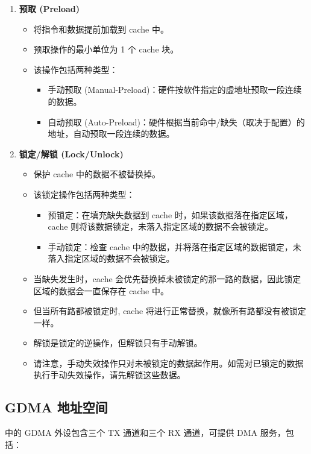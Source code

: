 \documentclass[main\_\_CN.tex]{subfiles}
\begin{document}
\begin{enumerate}
\item \textbf{预取 (Preload)}
\begin{itemize}
    \item 将指令和数据提前加载到 cache 中。
    \item 预取操作的最小单位为 1 个 cache 块。
    \item 该操作包括两种类型：
    \begin{itemize}
    \item 手动预取 (Manual-Preload)：硬件按软件指定的虚地址预取一段连续的数据。
    \item 自动预取 (Auto-Preload)：硬件根据当前命中/缺失（取决于配置）的地址，自动预取一段连续的数据。
    \end{itemize}
\end{itemize}

\item \textbf{锁定/解锁 (Lock/Unlock)}
\begin{itemize}
    \item 保护 cache 中的数据不被替换掉。
    \item 该锁定操作包括两种类型：
    \begin{itemize}
    \item 预锁定：在填充缺失数据到 cache 时，如果该数据落在指定区域，cache 则将该数据锁定，未落入指定区域的数据不会被锁定。
    \item 手动锁定：检查 cache 中的数据，并将落在指定区域的数据锁定，未落入指定区域的数据不会被锁定。
    \end{itemize}
    \item 当缺失发生时，cache 会优先替换掉未被锁定的那一路的数据，因此锁定区域的数据会一直保存在 cache 中。
    \item 但当所有路都被锁定时, cache 将进行正常替换，就像所有路都没有被锁定一样。
    \item 解锁是锁定的逆操作，但解锁只有手动解锁。
    \item 请注意，手动失效操作只对未被锁定的数据起作用。如需对已锁定的数据执行手动失效操作，请先解锁这些数据。
    
\end{itemize}
\end{enumerate}


\subsection{GDMA 地址空间}

\chipname{} 中的 GDMA 外设包含三个 TX 通道和三个 RX 通道，可提供 DMA 服务，包括：
\end{document}
